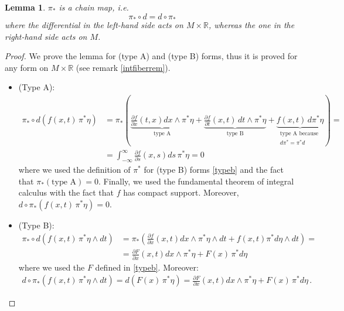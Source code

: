 \documentclass[a4paper,11pt,titlepage, article, oneside]{memoir}
\numberwithin{equation}{section}
\newtheorem{lemma}[theorem]{Lemma}
\theoremstyle{definition}
\theoremstyle{remark}
\newcommand{\rfield}{\mathbb{R}}
\newcommand{\defonde}[2]{\frac{\partial {#1}}{\partial {#2}}}
\begin{document}
\begin{lemma} \label{pichain}
$\pi_*$ is a chain map, i.e.
\begin{equation}
\pi_* \circ d  = d \circ \pi_*
\end{equation}
where the differential in the left-hand side acts on $M \times \rfield$, whereas the one in the right-hand side acts on $M$.
\end{lemma}
\begin{proof}
We prove the lemma for (type A) and (type B) forms, thus it is proved for any form on $M \times \rfield$ (see remark \ref{intfiberrem}).
\begin{itemize}
\item(Type A):
\begin{align*}
\pi_* \circ d \left ( f(x, t) \,\pi^* \eta \right ) &= \pi_* \left ( \underbrace{\defonde{f}{x}(t, x) dx \wedge \pi^* \eta}_{\text{type A}} + \underbrace{\defonde{f}{t}(x, t)\, dt \wedge \pi^* \eta}_{\text{type B}} + \underbrace{f(x, t) \, d\pi^* \eta}_{\substack{\text{type A because } \\ d\pi^*=\pi^*d}} \right ) = \\
&=\int_{-\infty}^{\infty} \defonde{f}{s}(x, s) ds \, \pi^* \eta = 0
\end{align*}
where we used the definition of $\pi^*$ for (type B) forms \eqref{typeb} and  the fact that $\pi_*(\text{type A}) = 0$. Finally, we used the fundamental theorem of integral calculus with the fact that $f$ has compact support.
Moreover, $d \circ \pi_*( f(x, t) \, \pi^*\eta) = 0$.
\item(Type B):
\begin{align*}
\pi_* \circ d (f(x, t) \, \pi^* \eta \wedge dt) &= \pi_* \left ( \defonde{f}{x} (x, t) dx \wedge \pi^*\eta \wedge dt + f(x, t) \pi^* d\eta \wedge dt \right)  = \\  
&=\defonde{F}{x}(x, t)dx \wedge \pi^* \eta + F(x) \, \pi^* d\eta 
\end{align*}
where we used the $F$ defined in \eqref{typeb}.
Moreover:
\begin{align*}
d \circ \pi_* (f(x, t) \, \pi^* \eta \wedge dt) = d(F(x)\, \pi^*\eta) = \defonde{F}{x}(x, t)dx \wedge \pi^* \eta + F(x) \, \pi^* d\eta  \, . 
\end{align*}
\end{itemize}
\end{proof}
\end{document}
